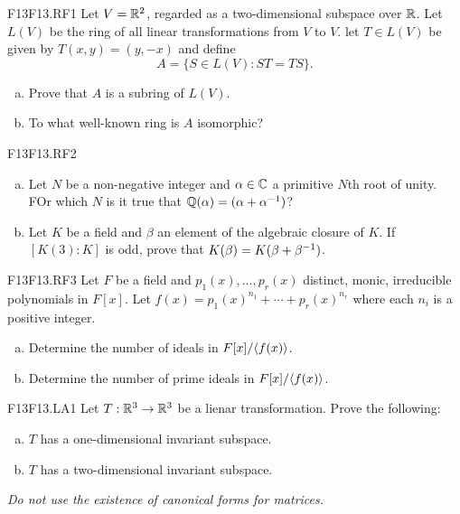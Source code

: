 \documentclass[../AlgebraQualSolutions.tex]{subfiles}
\begin{document}
	\begin{prob}{F13}{F13.RF1}
		Let $V = \mathbb{R}^2$, regarded as a two-dimensional subspace over $\mathbb{R}$. Let $L(V)$ be the ring of all linear transformations from $V$ to $V$. let $T \in L(V)$ be given by $T(x,y) = (y,-x)$ and define 
			\[A = \{S \in L(V): ST = TS\}. \]
		\begin{enumerate}[(a)]
			\item Prove that $A$ is a subring of $L(V)$.
			\item To what well-known ring is $A$ isomorphic?
		\end{enumerate}
	\end{prob}

	\begin{prob}{F13}{F13.RF2}

		\begin{enumerate}[(a)]
			\item Let $N$ be a non-negative integer and $\alpha \in \mathbb{C}$ a primitive $N$th root of unity. FOr which $N$ is it true that $\mathbb{Q}(\alpha) = (\alpha + \alpha^{-1})$?
			\item Let $K$ be a field and $\beta$ an element of the algebraic closure of $K$. If $[K(3):K]$ is odd, prove that $K(\beta) = K(\beta + \beta^{-1})$.
		\end{enumerate}
	\end{prob}

	\begin{prob}{F13}{F13.RF3}
		Let $F$ be a field and $p_1(x), \ldots, p_r(x)$ distinct, monic, irreducible polynomials in $F[x]$. Let $f(x) = p_1(x)^{n_1} + \cdots + p_r(x)^{n_r}$ where each $n_i$ is a positive integer.

		\begin{enumerate}[(a)]
			\item Determine the number of ideals in $F[x]/\langle f(x) \rangle$.
			\item Determine the number of prime ideals in $F[x]/\langle f(x) \rangle$.
		\end{enumerate}
	\end{prob}

	\begin{prob}{F13}{F13.LA1}
		Let $T: \mathbb{R}^3 \to \mathbb{R}^3$ be a lienar transformation. Prove the following:
		\begin{enumerate}[(a)]
			\item $T$ has a one-dimensional invariant subspace.
			\item $T$ has a two-dimensional invariant subspace.
		\end{enumerate}

		\emph{ Do not use the existence of canonical forms for matrices.}
	\end{prob}
\end{document}
